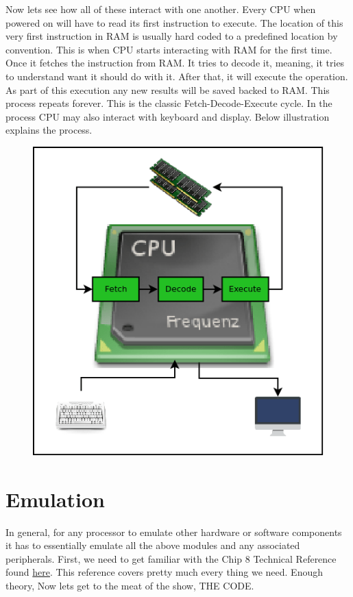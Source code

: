 \documentclass{article}
\begin{document}
Now lets see how all of these interact with one another.  Every CPU when powered on will have to read its first instruction to execute. The location of this  very first instruction in RAM is usually hard coded to a predefined location by convention. This is when CPU starts interacting with RAM for the first time. Once it fetches the instruction from RAM. It tries to decode it, meaning, it tries to understand want it should do with it. After that, it will execute the operation. As part of this execution any new results will be saved backed to RAM. This process repeats forever. This is the classic Fetch-Decode-Execute cycle. In the process CPU may also interact with keyboard and display. Below illustration explains the process.

\begin{figure}[H]
\centering
\includegraphics[width=\textwidth]{1.Emulator.png}
\caption{}
\end{figure}

\section{Emulation}
In general, for any processor to emulate other hardware or software components it has to essentially emulate all the above modules and any associated peripherals. First, we need to get familiar with the Chip 8 Technical Reference found \href{http://devernay.free.fr/hacks/chip8/C8TECH10.HTM}{here}. This reference covers pretty much every thing we need.
Enough theory, Now lets get to the meat of the show, THE CODE.
\end{document}
